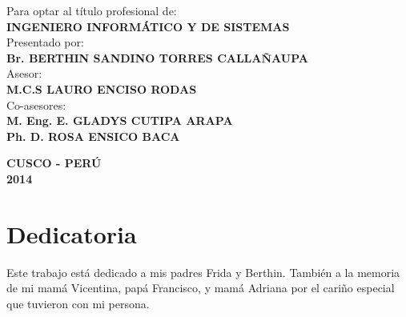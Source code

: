 \documentclass[12pt,oneside,a4paper]{book}
\theoremstyle{definition}
\begin{document}
\begin{center}
\begin{minipage}{\linewidth}
  \large
  \centering    
  \begin{minipage}{0.45\linewidth}
  \end{minipage}
  \hspace{0.28\linewidth}
  \begin{minipage}{0.7\linewidth}
    \begin{normalsize}
    Para optar al título profesional de:
    \vspace*{-0.1in}
    \\\textbf{INGENIERO INFORMÁTICO Y DE SISTEMAS}\\
    Presentado por: \vspace*{-0.1in}
    \\\textbf{Br. BERTHIN SANDINO TORRES CALLAÑAUPA}\\
    Asesor: \vspace*{-0.1in}
    \\\textbf{M.C.S LAURO ENCISO RODAS}\\
    Co-asesores: \vspace*{-0.1in}
    \\\textbf{M. Eng. E. GLADYS CUTIPA ARAPA} \vspace*{-0.1in}
    \\\textbf{Ph. D. ROSA ENSICO BACA}
    \end{normalsize}
  \end{minipage}
\end{minipage}

\vspace*{0.5in}
\textbf{CUSCO - PERÚ} \\
\textbf{2014}
\end{center}


\chapter*{Dedicatoria}
Este trabajo está dedicado a mis padres Frida y Berthin. También a la memoria de 
mi mamá Vicentina, papá Francisco, y mamá Adriana por el cariño especial que 
tuvieron con mi persona.
\end{document}
